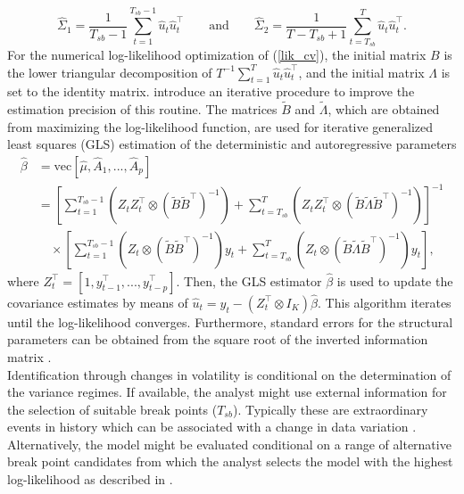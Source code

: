\documentclass[nojss]{jss}\usepackage[]{graphicx}\usepackage[]{color}
\begin{document}
$$
\widehat{\Sigma}_1 = \frac{1}{T_{sb} - 1} \sum _{t = 1}^{T_{sb} -1}\widehat{u}_t\widehat{u}_t^\top \qquad \text{and} \qquad \widehat{\Sigma}_2 = \frac{1}{T - T_{sb} + 1} \sum _{t = T_{sb}}^{T}\widehat{u}_t\widehat{u}_t^\top.
$$
 For the numerical log-likelihood optimization of (\ref{lik_cv}), the initial matrix $B$ is the lower triangular decomposition of $T^{-1} \sum^T_{t=1}\widehat{u}_t\widehat{u}_t^\top$, and the initial matrix $\Lambda$ is set to the identity matrix. \cite{LanneLuetkepohl2008} introduce an iterative procedure to improve the estimation precision of this routine. The matrices $\widetilde{B}$ and $\widetilde{\Lambda}$, which are obtained from maximizing the log-likelihood function, are used for iterative generalized least squares (GLS) estimation of the  deterministic and autoregressive parameters
\begin{align*}
\widehat{\beta} &= \mbox{vec}[\widehat{\mu}, \widehat{A}_1, ..., \widehat{A}_p] \\
                 &= \left[\sum^{T_{sb}-1}_{t=1}\left(Z_t Z_t^\top \otimes (\widetilde{B}\widetilde{B}^\top)^{-1}\right) + \sum^{T}_{t=T_{sb}}\left(Z_t Z_t^\top \otimes (\widetilde{B}\widetilde{\Lambda}\widetilde{B}^\top)^{-1}\right) \right]^{-1} \\
                 &\quad \times \left[\sum^{T_{sb}-1}_{t=1}\left(Z_t \otimes (\widetilde{B}\widetilde{B}^\top)^{-1}\right)y_t + \sum^{T}_{t=T_{sb}}\left(Z_t \otimes (\widetilde{B}\widetilde{\Lambda}\widetilde{B}^\top)^{-1}\right)y_t \right],
\end{align*}
where $Z_t^\top = [1, y_{t-1}^\top,...,y_{t-p}^\top]$. Then, the GLS estimator $\widehat{\beta}$ is used to update the covariance estimates by means of $\widehat{u}_t = y_t - (Z_t^\top \otimes I_K)\widehat{\beta}$. This algorithm iterates until the log-likelihood converges. Furthermore, standard errors for the structural parameters can be obtained from the square root of the inverted information matrix \citep{Hamilton1994}.\\
Identification through changes in volatility is conditional on the determination of the variance regimes. If available, the analyst might use external information for the selection of suitable break points ($T_{sb}$). {Typically these are extraordinary events in history which can be associated with a change in data variation \cite[see, e.g.,][]{RS2004}}. Alternatively, the model might be evaluated conditional on a range of alternative break point candidates from which the analyst selects the model with the highest log-likelihood as described in \cite{LS2018}.
\end{document}
